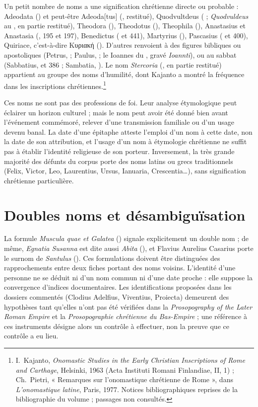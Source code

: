 Un petit nombre de noms a une signification chrétienne directe ou probable : Adeodata () et peut-être Adeoda[tus] (, restitué), Quodvultdeus ( ; \emph{Quodvuldeus} au , en partie restitué), Theodora (), Theodotus (), Theophila (), Anastasius et Anastasia (, 195 et 197), Benedictus ( et 441), Martyrius (), Pascasius ( et 400), Quiriace, c’est-à-dire Κυριακή (). D’autres renvoient à des figures bibliques ou apostoliques (Petrus,  ; Paulus,  ; le Ioannes du , gravé \emph{Ioannti}), ou au sabbat (Sabbatius,  et 386 ; Sambatia, ). Le nom \emph{Stercoria} (, en partie restitué) appartient au groupe des noms d’humilité, dont Kajanto a montré la fréquence dans les inscriptions chrétiennes.\footnote{I.~Kajanto, \emph{Onomastic Studies in the Early Christian Inscriptions of Rome and Carthage}, Helsinki, 1963 (Acta Instituti Romani Finlandiae, II, 1) ; Ch.~Pietri, « Remarques sur l’onomastique chrétienne de Rome », dans \emph{L’onomastique latine}, Paris, 1977. Notices bibliographiques reprises de la bibliographie du volume ; passages non consultés.}

Ces noms ne sont pas des professions de foi. Leur analyse étymologique peut éclairer un horizon culturel ; mais le nom peut avoir été donné bien avant l’événement commémoré, relever d’une transmission familiale ou d’un usage devenu banal. La date d’une épitaphe atteste l’emploi d’un nom à cette date, non la date de son attribution, et l’usage d’un nom à étymologie chrétienne ne suffit pas à établir l’identité religieuse de son porteur. Inversement, la très grande majorité des défunts du corpus porte des noms latins ou grecs traditionnels (Felix, Victor, Leo, Laurentius, Ursus, Ianuaria, Crescentia…), sans signification chrétienne particulière.

\section{Doubles noms et désambiguïsation}

La formule \emph{Muscula quae et Galatea} () signale explicitement un double nom ; de même, \emph{Egnatia Susanna} est dite aussi \emph{Abita} (), et Flavius Aurelius Casarius porte le surnom de \emph{Santulus} (). Ces formulations doivent être distinguées des rapprochements entre deux fiches portant des noms voisins. L’identité d’une personne ne se déduit ni d’un nom commun ni d’une date proche : elle suppose la convergence d’indices documentaires. Les identifications proposées dans les dossiers commentés (Clodius Adelfius, Viventius, Proiecta) demeurent des hypothèses tant qu’elles n’ont pas été vérifiées dans la \emph{Prosopography of the Later Roman Empire} et la \emph{Prosopographie chrétienne du Bas-Empire} ; une référence à ces instruments désigne alors un contrôle à effectuer, non la preuve que ce contrôle a eu lieu.
